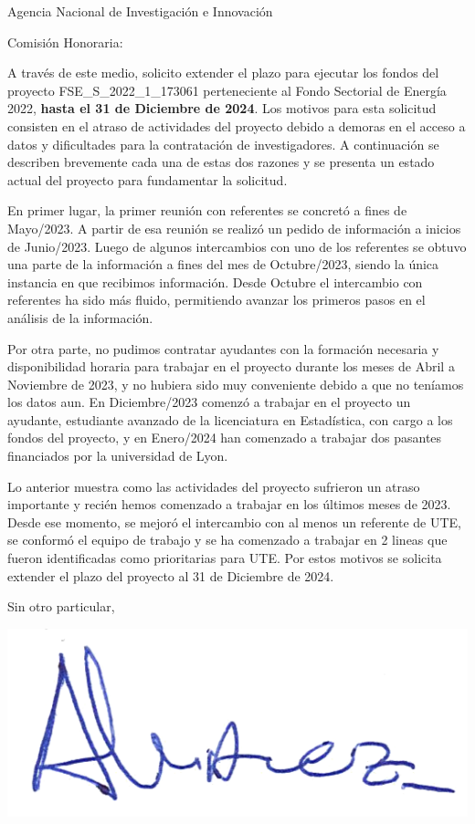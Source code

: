 \documentclass{letter}\usepackage[]{graphicx}\usepackage[]{xcolor}
\date{Montevideo, 31 de Enero de 2024}
\begin{document}
\begin{letter}{Agencia Nacional de Investigación e Innovación}
\opening{Comisión Honoraria:}

A través de este medio, solicito extender el plazo para ejecutar los fondos del proyecto FSE\_S\_2022\_1\_173061 perteneciente al Fondo Sectorial de Energía 2022, \textbf{hasta el 31 de Diciembre de 2024}. Los motivos para esta solicitud consisten en el atraso de actividades del proyecto debido a demoras en el acceso a datos y dificultades para la contratación de investigadores. A continuación se describen brevemente cada una de estas dos razones y se presenta un estado actual del proyecto para fundamentar la solicitud.

En primer lugar, la primer reunión con referentes se concretó a fines de Mayo/2023. A partir de esa reunión se realizó un pedido de información a inicios de Junio/2023. Luego de algunos intercambios con uno de los referentes se obtuvo una parte de la información a fines del mes de Octubre/2023, siendo la única instancia en que recibimos información. Desde Octubre el intercambio con referentes ha sido más fluido, permitiendo avanzar los primeros pasos en el análisis de la información.

Por otra parte, no pudimos contratar ayudantes con la formación necesaria y disponibilidad horaria para trabajar en el proyecto durante los meses de Abril a Noviembre de 2023, y no hubiera sido muy conveniente debido a que no teníamos los datos aun. En Diciembre/2023 comenzó a trabajar en el proyecto un ayudante, estudiante avanzado de la licenciatura en Estadística, con cargo a los fondos del proyecto, y en Enero/2024 han comenzado a trabajar dos pasantes financiados por la universidad de Lyon.  

Lo anterior muestra como las actividades del proyecto sufrieron un atraso importante y recién hemos comenzado a trabajar en los últimos meses de 2023. Desde ese momento, se mejoró el intercambio con al menos un referente de UTE, se conformó el equipo de trabajo y se ha comenzado a trabajar en 2 lineas que fueron identificadas como prioritarias para UTE. Por estos motivos se solicita extender el plazo del proyecto al 31 de Diciembre de 2024. 


\closing{Sin otro particular,}
\begin{center}
\includegraphics[scale=.5]{../firma_nacho}
\end{center}

\end{letter}
\end{document}
